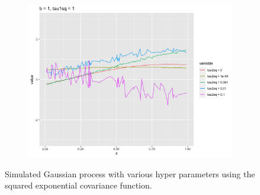 \documentclass[11pt]{article}
\begin{document}
\begin{enumerate}[(A)]
\begin{figure}
\begin{subfigure}[t]{0.6\textwidth}
        \includegraphics[width=\linewidth]{Ex6/figures/GP_tau2sq_seq.png} 
    \end{subfigure}
    \caption{Simulated Gaussian process with various hyper parameters using the squared exponential covariance function.}
    \label{fig:GPexp}
\end{figure}


\end{enumerate}
\end{document}
